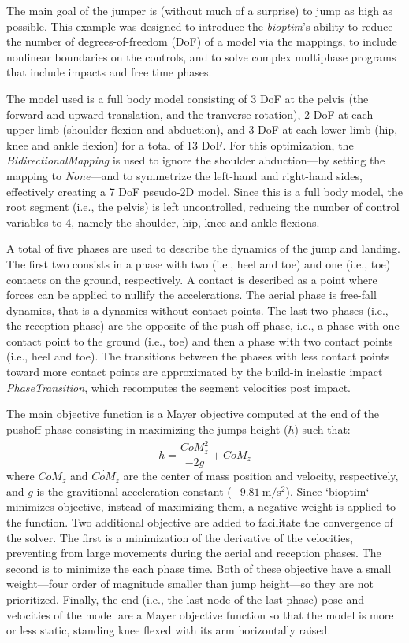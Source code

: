 The main goal of the jumper is (without much of a surprise) to jump as high as possible.
This example was designed to introduce the \emph{bioptim}'s ability to reduce the number of degrees-of-freedom (DoF) of a model via the mappings, to include nonlinear boundaries on the controls, and to solve complex multiphase programs that include impacts and free time phases.

The model used is a full body model consisting of 3 DoF at the pelvis (the forward and upward translation, and the tranverse rotation), 2 DoF at each upper limb (shoulder flexion and abduction), and 3 DoF at each lower limb (hip, knee and ankle flexion) for a total of 13 DoF.
For this optimization, the \emph{BidirectionalMapping} is used to ignore the shoulder abduction---by setting the mapping to \emph{None}---and to symmetrize the left-hand and right-hand sides, effectively creating a 7 DoF pseudo-2D model. 
Since this is a full body model, the root segment (i.e., the pelvis) is left uncontrolled, reducing the number of control variables to 4, namely the shoulder, hip, knee and ankle flexions. 

A total of five phases are used to describe the dynamics of the jump and landing. 
The first two consists in a phase with two (i.e., heel and toe) and one (i.e., toe) contacts on the ground, respectively. 
A contact is described as a point where forces can be applied to nullify the accelerations. 
The aerial phase is free-fall dynamics, that is a dynamics without contact points.
The last two phases (i.e., the reception phase) are the opposite of the push off phase, i.e., a phase with one contact point to the ground (i.e., toe) and then a phase with two contact points (i.e., heel and toe).
The transitions between the phases with less contact points toward more contact points are approximated by the build-in inelastic impact \emph{PhaseTransition}, which recomputes the segment velocities post impact.

The main objective function is a Mayer objective computed at the end of the pushoff phase consisting in maximizing the jumps height ($h$) such that:
\[
h = \frac{\dot{CoM_z^2}}{-2 g} + CoM_z
\]
where $CoM_z$ and $\dot{CoM_z}$ are the center of mass position and velocity, respectively, and $g$ is the gravitional acceleration constant ($\SI{-9.81}{\meter/\second^2}$).
Since `bioptim` minimizes objective, instead of maximizing them, a negative weight is applied to the function. 
Two additional objective are added to facilitate the convergence of the solver.
The first is a minimization of the derivative of the velocities, preventing from large movements during the aerial and reception phases. 
The second is to minimize the each phase time.
Both of these objective have a small weight---four order of magnitude smaller than jump height---so they are not prioritized.
Finally, the end (i.e., the last node of the last phase) pose and velocities of the model are a Mayer objective function so that the model is more or less static, standing knee flexed with its arm horizontally raised. 

